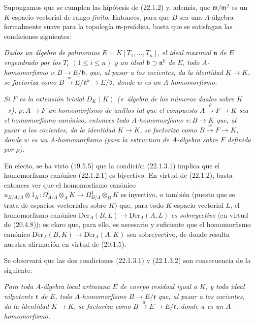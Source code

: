 \begin{remark}[22.1.3]
\label{0.22.1.3-fr}
Supongamos que se cumplen las hipótesis de (22.1.2) y, además, que
$\mathfrak m/\mathfrak m^2$ es un $K$-espacio vectorial de rango \emph{finito}.
Entonces, para que $B$ sea una $A$-álgebra formalmente suave para la topología
$\mathfrak m$-preádica, basta que se satisfagan las condiciones siguientes:

\begin{env}[22.1.3.1]
\label{0.22.1.3.1-fr}
\itshape Dados un álgebra de polinomios $E=K[T_1,\ldots,T_n]$, el ideal maximal
$\mathfrak n$ de $E$ engendrado por los $T_i$ $(1\leqslant i\leqslant n)$ y
un ideal $\mathfrak b\supset\mathfrak n^k$ de $E$, todo
$A$-homomorfismo $v:B\to E/\mathfrak b$, que, al pasar a los cocientes,
da la identidad $K\to K$, se factoriza como
$B\xrightarrow{w}E/\mathfrak n^k\to E/\mathfrak b$,
donde $w$ es un $A$-homomorfismo.
\end{env}

\begin{env}[22.1.3.2]
\label{0.22.1.3.2-fr}
\itshape Si $F$ es la extensión trivial $D_K(K)$ \textup{(«~álgebra de los números duales
sobre $K$~»)}, $\rho:A\to F$ un homomorfismo de anillos tal que el compuesto
$A\xrightarrow{\rho}F\to K$ sea el homomorfismo canónico, entonces todo
$A$-homomorfismo $v:B\to K$ que, al pasar a los cocientes, da la
identidad $K\to K$, se factoriza como
$B\xrightarrow{w}F\to K$,
donde $w$ es un $A$-homomorfismo (para la estructura de $A$-álgebra
sobre $F$ definida por $\rho$).
\end{env}

En efecto, se ha visto (19.5.5) que la condición (22.1.3.1) implica que el
homomorfismo canónico (22.1.2.1) es biyectivo. En virtud de (22.1.2), basta
entonces ver que el homomorfismo canónico
$u_{B/A/\Lambda}\otimes1_K:\Omega^1_{A/\Lambda}\otimes_AK\to\Omega^1_{B/\Lambda}\otimes_BK$
es inyectivo, o también (puesto que se trata de espacios vectoriales sobre
$K$) que, para todo $K$-espacio vectorial $L$, el homomorfismo canónico
$\operatorname{D\acute{e}r}_\Lambda(B,L)\to\operatorname{D\acute{e}r}_\Lambda(A,L)$ \emph{es
sobreyectivo} (en virtud de (20.4.8)); es claro que, para ello, es
necesario y suficiente que el homomorfismo canónico
$\operatorname{D\acute{e}r}_\Lambda(B,K)\to\operatorname{D\acute{e}r}_\Lambda(A,K)$ sea
sobreyectivo, de donde resulta nuestra afirmación en virtud de (20.1.5).

Se observará que las dos condiciones (22.1.3.1) y (22.1.3.2) son consecuencia
de la siguiente:

\begin{env}[22.1.3.3]
\label{0.22.1.3.3-fr}
\itshape Para toda $A$-álgebra local \textup{artiniana} $E$ de cuerpo residual \textup{igual a}
$K$, y todo ideal nilpotente $\mathfrak r$ de $E$, todo
$A$-homomorfismo $B\to E/\mathfrak r$ que, al pasar a los cocientes,
da la identidad $K\to K$, se factoriza como
$B\xrightarrow{u}E\to E/\mathfrak r$, donde $u$ es un
$A$-homomorfismo.
\end{env}
\end{remark}

